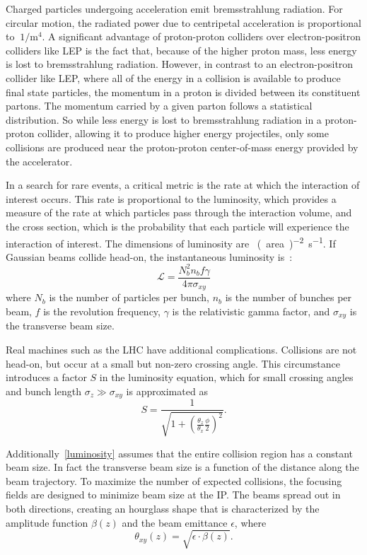 Charged particles undergoing acceleration emit bremsstrahlung radiation. For
circular motion, the radiated power due to centripetal acceleration is
proportional to $\SI{}{1\per\m^4}$. A significant advantage of proton-proton
colliders over electron-positron colliders like LEP is the fact that, because of
the higher proton mass, less energy is lost to bremsstrahlung radiation.
However, in contrast to an electron-positron collider like LEP, where all of the
energy in a collision is available to produce final state particles, the
momentum in a proton is divided between its constituent partons. The momentum
carried by a given parton follows a statistical distribution. So while less
energy is lost to bremsstrahlung radiation in a proton-proton collider, allowing
it to produce higher energy projectiles, only some collisions are produced near
the proton-proton center-of-mass energy provided by the accelerator.

In a search for rare events, a critical metric is the rate at which the
interaction of interest occurs. This rate is proportional to the luminosity,
which provides a measure of the rate at which particles pass through the
interaction volume, and the cross section, which is the probability that each
particle will experience the interaction of interest. The dimensions of
luminosity are \SI{}{(area)^{-2}\second^{-1}}. If Gaussian beams collide
head-on, the instantaneous luminosity is~\cite{Herr:941318}:
\begin{equation}
  \mathcal{L} = \frac{N_b^2 n_b f \gamma}{4 \pi \sigma_{xy}}
  \label{luminosity}
\end{equation}
where $N_b$ is the number of particles per bunch, $n_b$ is the number of bunches
per beam, $f$ is the revolution frequency, $\gamma$ is the relativistic gamma
factor, and $\sigma_{xy}$ is the transverse beam size.

Real machines such as the LHC have additional complications. Collisions are not
head-on, but occur at a small but non-zero crossing angle. This circumstance
introduces a factor $S$ in the luminosity equation, which for small crossing
angles and bunch length $\sigma_z \gg \sigma_{xy}$ is approximated as
\begin{equation}
  S = \frac{1}{\sqrt{1 + (\frac{\theta_z}{\theta_x} \frac{\phi}{2})^2}}.
\end{equation}

Additionally~\cref{luminosity} assumes that the entire collision region has a
constant beam size. In fact the transverse beam size is a function of the
distance along the beam trajectory. To maximize the number of expected
collisions, the focusing fields are designed to minimize beam size at the IP.
The beams spread out in both directions, creating an hourglass shape that is
characterized by the amplitude function $\beta(z)$ and the beam emittance
$\epsilon$, where
\begin{equation}
  \theta_{xy}(z) = \sqrt{\epsilon \cdot \beta(z)}.
\end{equation}

